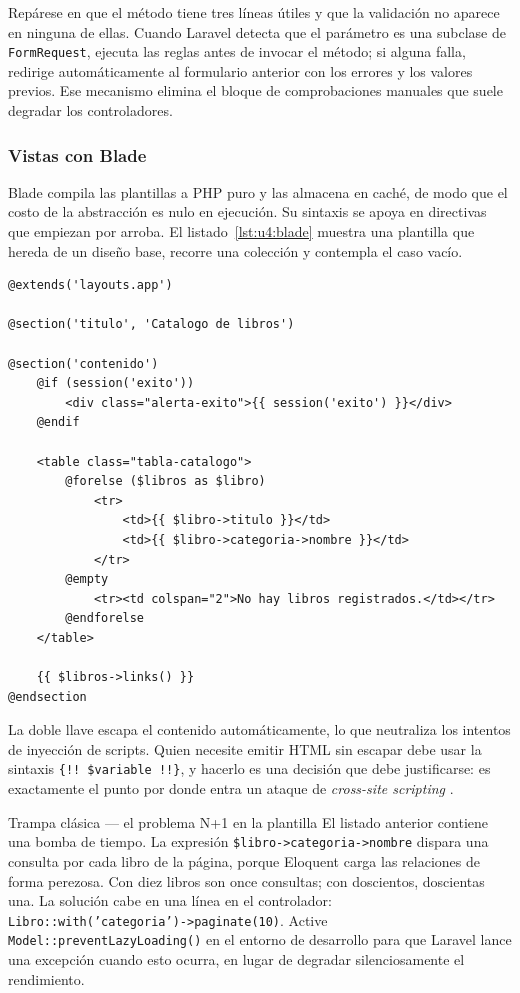 \documentclass[11pt,a4paper,openany]{book}
\begin{document}
Repárese en que el método tiene tres líneas útiles y que la validación no aparece en ninguna de ellas. Cuando Laravel detecta que el parámetro es una subclase de \texttt{FormRequest}, ejecuta las reglas antes de invocar el método; si alguna falla, redirige automáticamente al formulario anterior con los errores y los valores previos. Ese mecanismo elimina el bloque de comprobaciones manuales que suele degradar los controladores.

\subsubsection{Vistas con Blade}

Blade compila las plantillas a PHP puro y las almacena en caché, de modo que el costo de la abstracción es nulo en ejecución. Su sintaxis se apoya en directivas que empiezan por arroba. El listado~\ref{lst:u4:blade} muestra una plantilla que hereda de un diseño base, recorre una colección y contempla el caso vacío.

\begin{lstlisting}[style=php,caption={Plantilla Blade con herencia de diseno y manejo del caso vacio.},label={lst:u4:blade}]
@extends('layouts.app')

@section('titulo', 'Catalogo de libros')

@section('contenido')
	@if (session('exito'))
		<div class="alerta-exito">{{ session('exito') }}</div>
	@endif

	<table class="tabla-catalogo">
		@forelse ($libros as $libro)
			<tr>
				<td>{{ $libro->titulo }}</td>
				<td>{{ $libro->categoria->nombre }}</td>
			</tr>
		@empty
			<tr><td colspan="2">No hay libros registrados.</td></tr>
		@endforelse
	</table>

	{{ $libros->links() }}
@endsection
\end{lstlisting}

La doble llave escapa el contenido automáticamente, lo que neutraliza los intentos de inyección de scripts. Quien necesite emitir HTML sin escapar debe usar la sintaxis \texttt{\{!! \$variable !!\}}, y hacerlo es una decisión que debe justificarse: es exactamente el punto por donde entra un ataque de \emph{cross-site scripting} \cite{owasp2021top10}.

\begin{cajaadvertencia}{Trampa clásica --- el problema N+1 en la plantilla}
	El listado anterior contiene una bomba de tiempo. La expresión \texttt{\$libro->categoria->nombre} dispara una consulta por cada libro de la página, porque Eloquent carga las relaciones de forma perezosa. Con diez libros son once consultas; con doscientos, doscientas una. La solución cabe en una línea en el controlador: \texttt{Libro::with('categoria')->paginate(10)}. Active \texttt{Model::preventLazyLoading()} en el entorno de desarrollo para que Laravel lance una excepción cuando esto ocurra, en lugar de degradar silenciosamente el rendimiento.
\end{cajaadvertencia}
\end{document}
